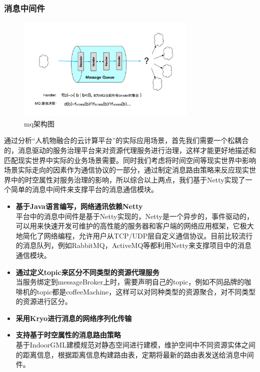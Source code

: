 \documentclass[a4paper, 12pt]{article}
\theoremstyle{definition}
\begin{document}
\subsubsection{消息中间件}
\begin{figure}[ht]
 \centering
 \includegraphics[height=5cm]{images/mq_architecture.jpg}
 \caption{mq架构图}
 \label{fig:singleblock}
\end{figure}
通过分析“人机物融合的云计算平台”的实际应用场景，首先我们需要一个松耦合的，消息驱动的服务治理平台来对资源代理服务进行治理，这样才能更好地描述和匹配现实世界中实际的业务场景需要。同时我们考虑将时间空间等现实世界中影响场景实际走向的因素作为通信协议的一部分，通过制定消息路由策略来反应现实世界中的时空属性对服务治理的影响，所以综合以上两点，我们基于Netty实现了一个简单的消息中间件来支撑平台的消息通信模块。

\begin{itemize}
    \item {\textbf{基于Java语言编写，网络通讯依赖Netty}}\\
    平台中的消息中间件是基于Netty实现的，Netty是一个异步的，事件驱动的，可以用来快速开发可维护的高性能的服务器和客户端的网络应用框架，它极大地简化了网络编程，允许用户从TCP/UDP层自定义通信协议。目前比较流行的消息队列，例如RabbitMQ，ActiveMQ等都利用Netty来支撑项目中的消息通信模块。
    \item {\textbf{通过定义topic来区分不同类型的资源代理服务}}\\
    当服务绑定到messageBroker上时，需要声明自己的topic，例如不同品牌的咖啡机的topic都是coffeeMachine，这样可以对同种类型的资源聚合，对不同类型的资源进行区分。
    \item {\textbf{采用Kryo进行消息的网络序列化传输}}
    \item{\textbf{支持基于时空属性的消息路由策略}}\\
    基于IndoorGML建模规范对静态空间进行建模，维护空间中不同资源实体之间的距离信息，根据距离信息构建路由表，定期将最新的路由表发送给消息中间件。
\end{itemize}
\newpage
\end{document}
